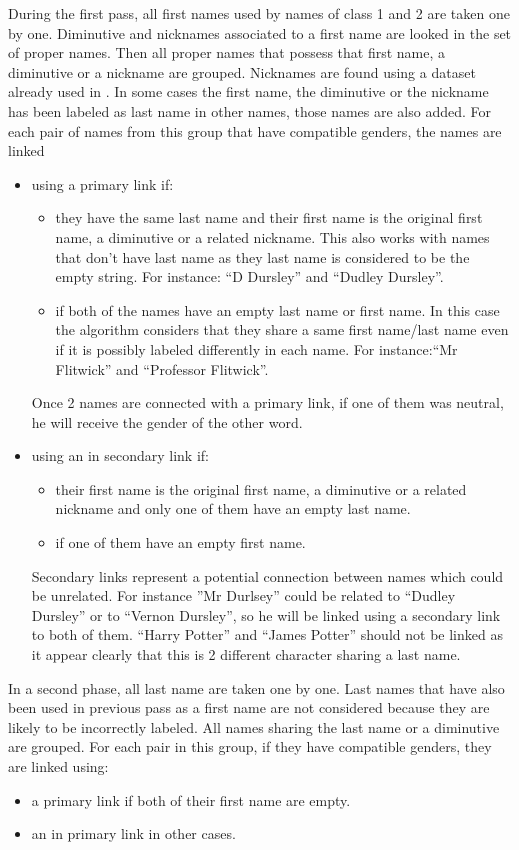 \documentclass[a4paper, 12pt]{report}
\begin{document}
During the first pass, all first names used by names of class 1 and 2  are taken one by one.
 Diminutive and nicknames associated to a first name are looked in the set of proper names. 
 Then all proper names that possess that first name, a diminutive or a nickname are grouped. 
 Nicknames are found using a dataset \citep{dbNickname} already used in \cite{structure_clustering}.  
 In some cases the first name, the diminutive or the nickname has been labeled as last name in other names, those names are also added. 
 For each pair of names from this group that have compatible genders, the names are linked
\begin{itemize}
\item 
	 using a  primary link if:
	\begin{itemize}
	\item they have the same last name and their first name is the original first name, a diminutive or a related nickname. 
	This also works with names that don't have last name as they last name is considered to be the empty string.  For instance: ``D Dursley'' and ``Dudley Dursley''. 
	\item if both of the names have an empty last name or first name. 
	In this case the algorithm considers that they share a same first name/last name even if it is possibly labeled differently in each name. 
	For instance:``Mr Flitwick'' and ``Professor Flitwick''.
	\end{itemize}
	Once 2 names are connected with a  primary link, if one of them was neutral, he will receive the gender of the other word.
\item
	 using an  in secondary link if:
	 	\begin{itemize}
	\item their first name is the original first name, a diminutive or a related nickname and only one of them have an empty last name. 
	\item if one of them have an empty first name.
		\end{itemize}
	Secondary  links represent a potential connection between names which could be unrelated. 
	For instance ''Mr Durlsey'' could be related to ``Dudley Dursley'' or to ``Vernon Dursley'', so he will be linked using a secondary link to both of them.
	``Harry Potter'' and ``James Potter'' should not be linked as it appear clearly that this is 2 different character sharing a last name.
\end{itemize}

In a second phase, all last name are taken one by one. 
Last names that have also been used in previous pass as a first name are not considered because they are likely to be incorrectly labeled. 
All names sharing the last name or a diminutive are grouped. For each pair in this group, if they have compatible genders, they are linked using:
\begin{itemize}
\item a  primary link if both of their first name are empty. 
\item an in primary link in other cases.
\end{itemize}
\end{document}

